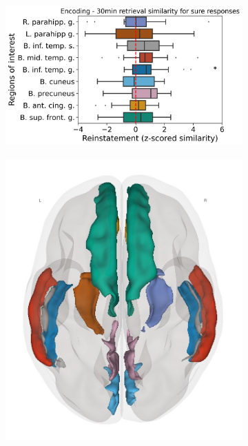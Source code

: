  \begin{figure}[!ht]
    \centering
\begin{subfigure}[]{0.6\linewidth}
    \centering
    \includegraphics[width=\linewidth]{paper/src/figures/20240530_wb-array_n__enc_ret1_perm_consc_consc-unconsc_incorr.png}
\end{subfigure}
\begin{subfigure}[]{0.19\linewidth}
    \centering
    \includegraphics[width=\linewidth]{paper/src/figures/wb_rois_top.jpg}

\end{subfigure}
\end{figure}
